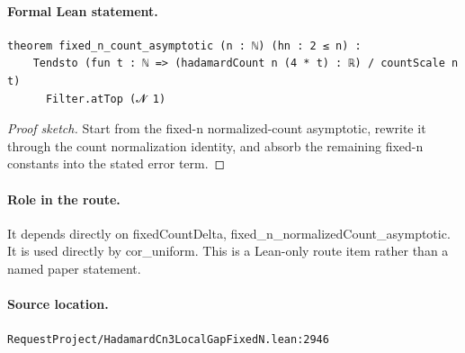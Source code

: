 \medskip
\paragraph{Formal Lean statement.}
\begin{verbatim}
theorem fixed_n_count_asymptotic (n : ℕ) (hn : 2 ≤ n) :
    Tendsto (fun t : ℕ => (hadamardCount n (4 * t) : ℝ) / countScale n t)
      Filter.atTop (𝓝 1)
\end{verbatim}
\begin{proof}[Proof sketch]
Start from the fixed-n normalized-count asymptotic, rewrite it through the count normalization identity, and absorb the remaining fixed-n constants into the stated error term.
\end{proof}
\paragraph{Role in the route.}
It depends directly on fixedCountDelta, fixed\_n\_normalizedCount\_asymptotic. It is used directly by cor\_uniform. This is a Lean-only route item rather than a named paper statement.
\paragraph{Source location.}
\texttt{RequestProject/HadamardCn3LocalGapFixedN.lean:2946}
\medskip

